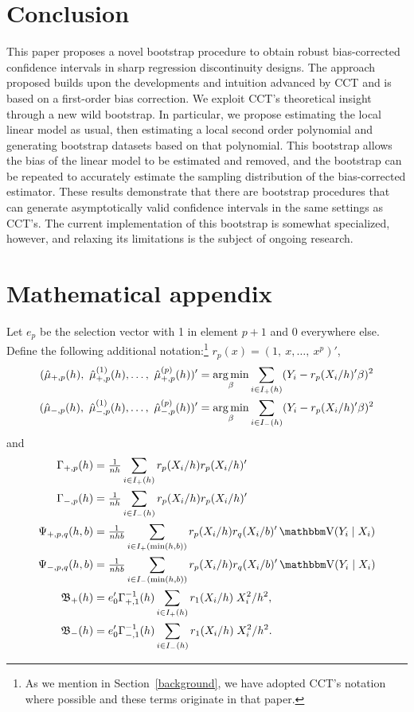 \documentclass[12pt,fleqn]{article}
\begin{document}
\section{Conclusion}\label{conclusion}

This paper proposes a novel bootstrap procedure to obtain robust bias-corrected
confidence intervals in sharp regression discontinuity designs. The approach proposed builds upon the developments and intuition
advanced by CCT and is based on a first-order bias correction. We exploit CCT's
theoretical insight through a new wild bootstrap. In particular, we propose
estimating the local linear model as usual, then estimating a local second order
polynomial and generating bootstrap datasets based on that
polynomial. This bootstrap allows the bias of the linear model to be estimated
and removed, and the bootstrap can be repeated to accurately estimate the
sampling distribution of the bias-corrected estimator. These results demonstrate
that there are bootstrap procedures that can generate asymptotically valid
confidence intervals in the same settings as CCT's. The current implementation
of this bootstrap is somewhat specialized, however, and relaxing its limitations
is the subject of ongoing research.

\appendix
\section{Mathematical appendix}
Let $e_p$ be the selection vector with 1 in element $p+1$ and 0
everywhere else. Define the following additional notation:\footnote{%
  As we mention in Section~\ref{background}, we have adopted CCT's
  notation where possible and these terms originate in that paper.} %
$r_p(x) = (1,\ x,\dots,\ x^p)'$,
\begin{align*}
  (\hat{\mu}_{+,p}(h),\ \hat{\mu}_{+,p}^{(1)}(h),\dots,\ \hat\mu_{+,p}^{(p)}(h))'
  &= \argmin_{\beta} \ssum[+]{i}{h} (Y_i - r_p(X_i/h)'\beta)^2 \\
  (\hat{\mu}_{-,p}(h),\ \hat{\mu}_{-,p}^{(1)}(h),\dots,\ \hat\mu_{-,p}^{(p)}(h))'
  &= \argmin_{\beta} \ssum[-]{i}{h} (Y_i - r_p(X_i/h)'\beta)^2
\end{align*}
and
\begin{align*}
  \Gamma_{+,p}(h) &= \tfrac{1}{nh} \ssum[+]{i}{h} r_p(X_i/h) r_p(X_i/h)' \\
  \Gamma_{-,p}(h) &= \tfrac{1}{nh} \ssum[-]{i}{h} r_p(X_i/h) r_p(X_i/h)' \\
  \Psi_{+,p,q}(h,b)
  &= \tfrac{1}{nhb} \ssum[+]{i}{\min(h,b)} r_p(X_i/h) r_q(X_i/b)'
    \V(Y_i \mid X_i) \\
  \Psi_{-,p,q}(h,b)
  &= \tfrac{1}{nhb} \ssum[-]{i}{\min(h,b)} r_p(X_i/h) r_q(X_i/b)'
    \V(Y_i \mid X_i) \\
  \Bf_+(h)
  & = e_0' \Gamma_{+,1}^{-1}(h)
    \ssum[+]{i}{h} r_1(X_i/h) \; X_i^2 / h^2, \\
  \Bf_-(h)
  & = e_0' \Gamma_{-,1}^{-1}(h)
    \ssum[-]{i}{h} r_1(X_i/h) \; X_i^2 / h^2.
\end{align*}
\end{document}
